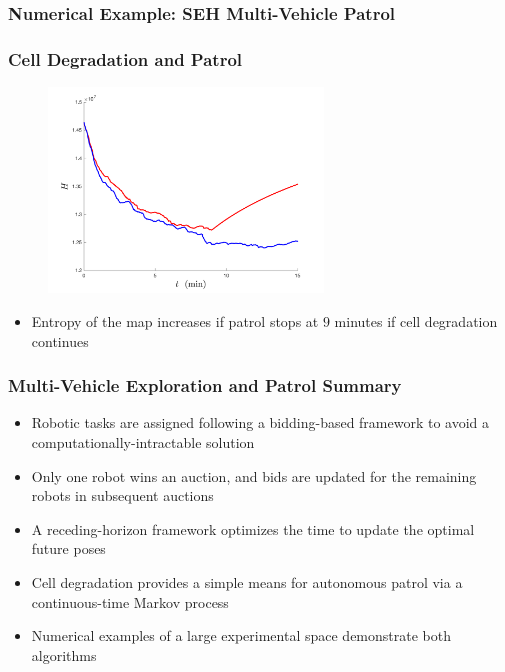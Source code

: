 \documentclass[11pt,professionalfonts,hyperref={pdftex,pdfpagemode=none,pdfstartview=FitH}]{beamer}
\begin{document}
\begin{frame}
\frametitle{Numerical Example: SEH Multi-Vehicle Patrol}




\end{frame}

\begin{frame}
\frametitle{Cell Degradation and Patrol}

\begin{figure}
	\centering
	\includegraphics[width=0.65\textwidth]{entropy_patrol_9minSwitch.pdf}
\end{figure}

\begin{itemize}
	\item Entropy of the map increases if patrol stops at $9$ minutes if cell degradation continues
\end{itemize}

\end{frame} 

\begin{frame}
\frametitle{Multi-Vehicle Exploration and Patrol Summary}

\begin{itemize}
	\item Robotic tasks are assigned following a bidding-based framework to avoid a computationally-intractable solution
	\item Only one robot wins an auction, and bids are updated for the remaining robots in subsequent auctions
	\item A receding-horizon framework optimizes the time to update the optimal future poses
	\item Cell degradation provides a simple means for autonomous patrol via a continuous-time Markov process
	\item Numerical examples of a large experimental space demonstrate both algorithms
\end{itemize}
\end{frame}
\end{document}
